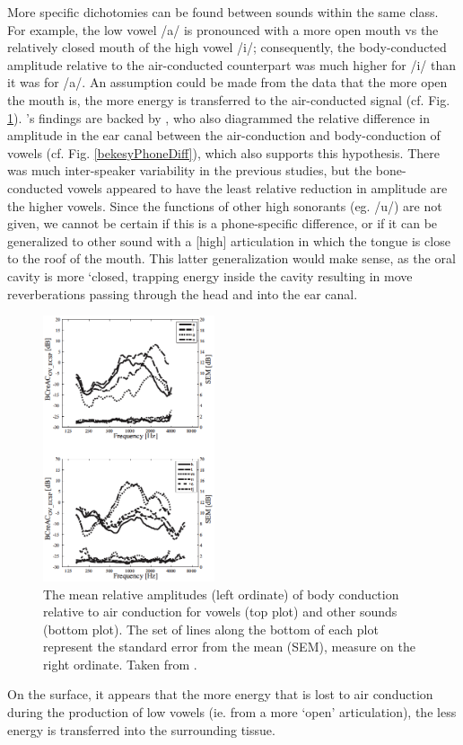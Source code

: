 More specific dichotomies can be found between sounds within the same class. For example, the low vowel /a/ is pronounced with a more open mouth vs the relatively closed mouth of the high vowel /i/; consequently, the body-conducted amplitude relative to the air-conducted counterpart was much higher for /i/ than it was for /a/. An assumption could be made from the data that the more open the mouth is, the more energy is transferred to the air-conducted signal (cf. Fig. \ref{BCrelACall}). \cite{reinfeldt:10}'s findings are backed by \cite{bekesy:60}, who also diagrammed the relative difference in amplitude in the ear canal between the air-conduction and body-conduction of vowels (cf. Fig. \ref{bekesyPhoneDiff}), which also supports this hypothesis.  There was much inter-speaker variability in the previous studies, but the bone-conducted vowels appeared to have the least relative reduction in amplitude are the higher vowels.  Since the functions of other high sonorants (eg. /u/) are not given, we cannot be certain if this is a phone-specific difference, or if it can be generalized to other sound with a [high] articulation in which the tongue is close to the roof of the mouth.  This latter generalization would make sense, as the oral cavity is more `closed, trapping energy inside the cavity resulting in move reverberations passing through the head and into the ear canal.
%
\begin{figure}
\includegraphics[width=0.45\textwidth]{figure/BC_rel_AC_all.png}
\caption{The mean relative amplitudes (left ordinate) of body conduction relative to air conduction for vowels (top plot) and other sounds (bottom plot).  The set of lines along the bottom of each plot represent the standard error from the mean (SEM), measure on the right ordinate.  Taken from \cite{reinfeldt:10}.}
\label{BCrelACall}
\end{figure}
%
On the surface, it appears that the more energy that is lost to air conduction during the production of low vowels (ie. from a more `open' articulation), the less energy is transferred into the surrounding tissue.

